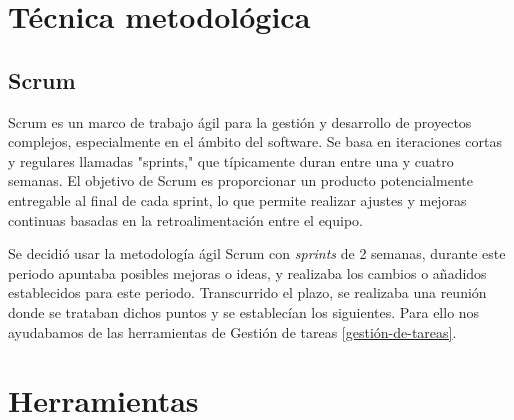 
\begin{comment}
Esta parte de la memoria tiene como objetivo presentar las técnicas metodológicas y las herramientas de desarrollo que se han utilizado para llevar a cabo el proyecto. Si se han estudiado diferentes alternativas de metodologías, herramientas, bibliotecas se puede hacer un resumen de los aspectos más destacados de cada alternativa, incluyendo comparativas entre las distintas opciones y una justificación de las elecciones realizadas. 
No se pretende que este apartado se convierta en un capítulo de un libro dedicado a cada una de las alternativas, sino comentar los aspectos más destacados de cada opción, con un repaso somero a los fundamentos esenciales y referencias bibliográficas para que el lector pueda ampliar su conocimiento sobre el tema.
\end{comment}


\section{Técnica metodológica}

\subsection{Scrum}\label{scrum}

Scrum es un marco de trabajo ágil para la gestión y desarrollo de proyectos complejos, especialmente en el ámbito del software. Se basa en iteraciones cortas y regulares llamadas "sprints," que típicamente duran entre una y cuatro semanas. El objetivo de Scrum es proporcionar un producto potencialmente entregable al final de cada sprint, lo que permite realizar ajustes y mejoras continuas basadas en la retroalimentación entre el equipo. \cite{schwaber2020}

Se decidió usar la metodología ágil Scrum con \textit{sprints} de 2 semanas, durante este periodo apuntaba posibles mejoras o ideas, y realizaba los cambios o añadidos establecidos para este periodo. Transcurrido el plazo, se realizaba una reunión donde se trataban dichos puntos y se establecían los siguientes. Para ello nos ayudabamos de las herramientas de Gestión de tareas \ref{gestión-de-tareas}.


\section{Herramientas}

